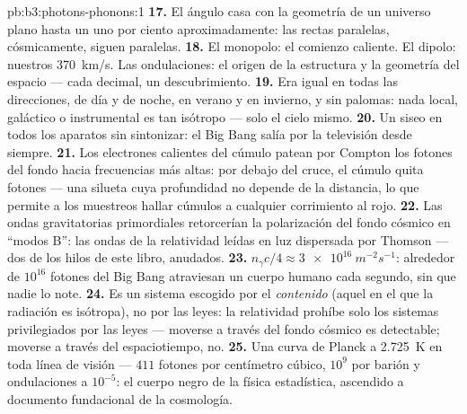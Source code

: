 \begin{solution}{pb:b3:photons-phonons:1}
\textbf{17.} El ángulo casa con la geometría de un universo plano hasta
un uno por ciento aproximadamente: las rectas paralelas, cósmicamente, siguen paralelas.
\textbf{18.} El monopolo: el comienzo caliente. El dipolo: nuestros
\qty{370}{km/s}. Las ondulaciones: el origen de la estructura y la
geometría del espacio --- cada decimal, un descubrimiento.
\textbf{19.} Era igual en todas las direcciones, de día y de noche,
en verano y en invierno, y sin palomas: nada local, galáctico o
instrumental es tan isótropo --- solo el cielo mismo.
\textbf{20.} Un siseo en todos los aparatos sin sintonizar: el Big Bang salía
por la televisión desde siempre.
\textbf{21.} Los electrones calientes del cúmulo patean por Compton los fotones
del fondo hacia frecuencias más altas: por debajo del cruce, el cúmulo quita
fotones --- una silueta cuya profundidad no depende de la distancia,
lo que permite a los muestreos hallar cúmulos a cualquier corrimiento al rojo.
\textbf{22.} Las ondas gravitatorias primordiales retorcerían la
polarización del fondo cósmico en ``modos B'': las ondas de la relatividad leídas
en luz dispersada por Thomson --- dos de los hilos de este libro, anudados.
\textbf{23.} $n_\gamma c/4 \approx \qty{3e16}{m^{-2}s^{-1}}$:
alrededor de $10^{16}$ fotones del Big Bang atraviesan un cuerpo humano cada segundo,
sin que nadie lo note.
\textbf{24.} Es un sistema escogido por el \emph{contenido}
(aquel en el que la radiación es isótropa), no por las leyes: la relatividad
prohíbe solo los sistemas privilegiados por las leyes --- moverse a través del
fondo cósmico es detectable; moverse a través del espaciotiempo, no.
\textbf{25.} Una curva de Planck a \qty{2.725}{K} en toda línea de visión
--- $411$ fotones por centímetro cúbico, $10^9$ por barión y
ondulaciones a $10^{-5}$: el cuerpo negro de la física estadística, ascendido
a documento fundacional de la cosmología.
\end{solution}
